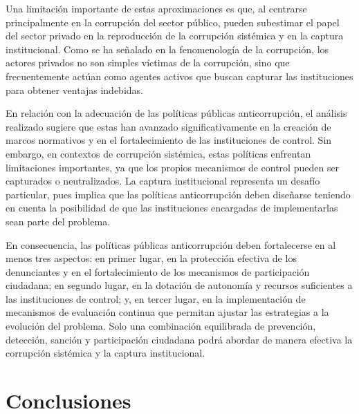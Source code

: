 \documentclass[12pt,a4paper]{article}
\begin{document}
Una limitación importante de estas aproximaciones es que, al centrarse principalmente en la corrupción del sector público, pueden subestimar el papel del sector privado en la reproducción de la corrupción sistémica y en la captura institucional. Como se ha señalado en la fenomenología de la corrupción, los actores privados no son simples víctimas de la corrupción, sino que frecuentemente actúan como agentes activos que buscan capturar las instituciones para obtener ventajas indebidas.

En relación con la adecuación de las políticas públicas anticorrupción, el análisis realizado sugiere que estas han avanzado significativamente en la creación de marcos normativos y en el fortalecimiento de las instituciones de control. Sin embargo, en contextos de corrupción sistémica, estas políticas enfrentan limitaciones importantes, ya que los propios mecanismos de control pueden ser capturados o neutralizados. La captura institucional representa un desafío particular, pues implica que las políticas anticorrupción deben diseñarse teniendo en cuenta la posibilidad de que las instituciones encargadas de implementarlas sean parte del problema.

En consecuencia, las políticas públicas anticorrupción deben fortalecerse en al menos tres aspectos: en primer lugar, en la protección efectiva de los denunciantes y en el fortalecimiento de los mecanismos de participación ciudadana; en segundo lugar, en la dotación de autonomía y recursos suficientes a las instituciones de control; y, en tercer lugar, en la implementación de mecanismos de evaluación continua que permitan ajustar las estrategias a la evolución del problema. Solo una combinación equilibrada de prevención, detección, sanción y participación ciudadana podrá abordar de manera efectiva la corrupción sistémica y la captura institucional.

\section{Conclusiones}
\end{document}
